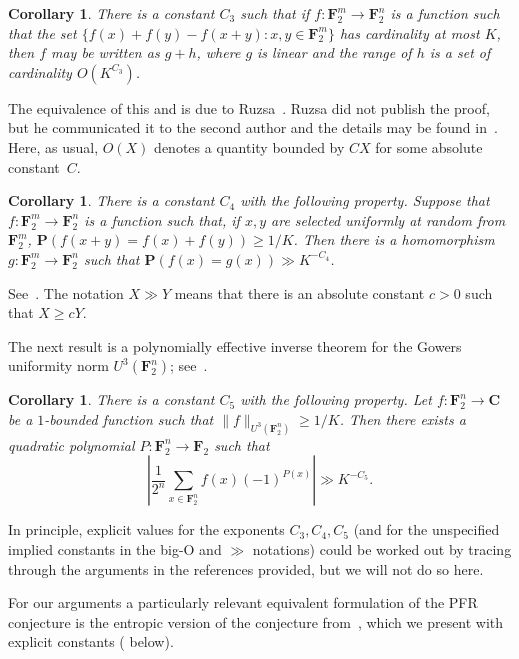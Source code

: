 \documentclass[12pt,reqno,tbtags]{amsart}
\newtheorem{corollary}[theorem]{Corollary}
\theoremstyle{definition}
\theoremstyle{remark}
\renewcommand{\geq}{\geqslant}
\def\F{\mathbf{F}}
\def\C{\mathbf{C}}
\def\P{\mathbf{P}}
\numberwithin{equation}{section}
\begin{document}
\begin{corollary}\label{additive-stability}
There is a constant $C_3$ such that if $f: \F_2^m \to \F_2^n$ is a function such that the set $\{ f(x)+f(y)-f(x+y): x,y \in \F_2^m\}$ has cardinality at most $K$, then $f$ may be written as $g+h$, where $g$ is linear and the range of $h$ is a set of cardinality $O(K^{C_3})$. \end{corollary}

\noindent The equivalence of this and  is due to Ruzsa~\cite[Conjecture 2.2.3]{ruzsa-sumsets-survey}. Ruzsa did not publish the proof, but he communicated it to the second author and the details may be found in~\cite{green-pfr-note}. Here, as usual, $O(X)$ denotes a quantity bounded by $CX$ for some absolute constant~$C$.

\begin{corollary}\label{partial-additivity}
There is a constant $C_4$ with the following property. Suppose that $f : \F_2^m \to \F_2^n$ is a function such that, if $x, y$ are selected uniformly at random from $\F_2^m$, $\P(f(x + y) = f(x) + f(y)) \geq 1/K$. Then there is a homomorphism $g \colon \F_2^m \to \F_2^n$ such that $\P(f(x) = g(x)) \gg K^{-C_4}$.
\end{corollary}

\noindent See~\cite[Theorem 4.1]{samorodnitsky}. The notation $X\gg Y$ means that there is an absolute constant $c>0$ such that $X\geq cY$.

The next result is a polynomially effective inverse theorem for the Gowers uniformity norm ${U^3(\F_2^n)}$; see~\cite{gt-equiv, lovett, samorodnitsky}.

\begin{corollary}\label{u3-inverse}
There is a constant $C_5$ with the following property. Let $f \colon \F_2^n \to \C$ be a $1$-bounded function such that $\|f\|_{U^3(\F_2^n)} \geq 1/K$. Then there exists a quadratic polynomial $P \colon \F_2^n \to \F_2$ such that \[ |\frac{1}{2^n} \sum_{x \in \F_2^n} f(x) (-1)^{P(x)}| \gg K^{-C_5}.\]
\end{corollary}

\noindent In principle, explicit values for the exponents $C_3,C_4, C_5$ (and for the unspecified implied constants in the big-O and $\gg$ notations) could be worked out by tracing through the arguments in the references provided, but we will not do so here.


For our arguments a particularly relevant equivalent formulation of the PFR conjecture is the entropic
version of the conjecture from~\cite{gmt}, which we present with explicit constants ( below).
\end{document}
